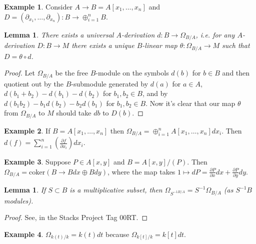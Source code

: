 \documentclass{article}
\theoremstyle{plain}
\newtheorem{lem}[thm]{Lemma}
\theoremstyle{definition}
\newtheorem{exmp}{Example}
\theoremstyle{remark}
\begin{document}
\begin{exmp}
Consider $A\to B=A[x_1,\ldots,x_n]$ and $D=(\partial_{x_1},\ldots,\partial_{x_n}):B\to\oplus_{i=1}^n B$.
\end{exmp}

\begin{lem}
\label{L93}
There exists a universal $A$-derivation $d:B\to\Omega_{B/A}$, i.e. for any $A$-derivation $D:B\to M$ there exists a unique $B$-linear map $\theta:\Omega_{B/A}\to M$ such that $D=\theta\circ d$.
\end{lem}
\begin{proof}
Let $\Omega_{B/A}$ be the free $B$-module on the symbols $d(b)$ for $b\in B$ and then quotient out by the $B$-submodule generated by $d(a)$ for $a\in A$, $d(b_1+b_2)-d(b_1)-d(b_2)$ for $b_1,b_2\in B$, and by $d(b_1b_2)-b_1d(b_2)-b_2d(b_1)$ for $b_1,b_2\in B$. Now it's clear that our map $\theta$ from $\Omega_{B/A}$ to $M$ should take $db$ to $D(b)$. 
\end{proof}

\begin{exmp}
If $B=A[x_1,\ldots,x_n]$ then $\Omega_{B/A}=\oplus_{i=1}^n A[x_1,\ldots,x_n]dx_i$. Then $d(f)=\sum_{i=1}^n\left(\frac{\partial f}{\partial x_i}\right)dx_i$.
\end{exmp}

\begin{exmp}
Suppose $P\in A[x,y]$ and $B=A[x,y]/(P)$. Then $\Omega_{B/A}=\text{coker}\left(B\longrightarrow Bdx\oplus Bdy \right)$, where the map takes $1\mapsto dP=\frac{\partial P}{\partial x}dx+\frac{\partial P}{\partial y}dy$.
\end{exmp}

\begin{lem}
\label{L94}
If $S\subset B$ is a multiplicative subset, then $\Omega_{S^{-1B/A}}=S^{-1}\Omega_{B/A}$ (as $S^{-1}B$ modules).
\end{lem}
\begin{proof}
See, in the Stacks Project Tag 00RT.
\end{proof}

\begin{exmp}
$\Omega_{k(t)/k}=k(t)dt$ because $\Omega_{k[t]/k}=k[t]dt$.
\end{exmp}
\end{document}
